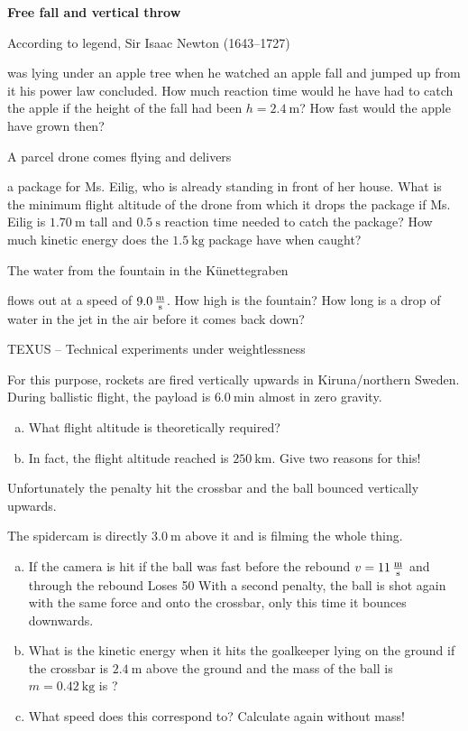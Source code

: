 \documentclass[a4paper]{article}
\begin{document}
	{\bf Free fall and vertical throw}
	
	\begin{enumerate}[1.]
		{\bf \item According to legend, Sir Isaac Newton (1643–1727) } was lying under an apple tree when he watched an apple fall and jumped up from it
		his power law concluded. How much reaction time would he have had to catch the apple if the height of the fall had been $h=\SI{2.4}{\meter}$?
		How fast would the apple have grown then?
		
		{\bf \item A parcel drone comes flying and delivers} a package for Ms. Eilig, who is already standing in front of her house. What is the minimum flight altitude of the drone from which it drops the package if Ms. Eilig is $\SI{1.70}{\meter}$ tall and $\SI{0.5}{\second}$ reaction time needed to catch the package? How much kinetic energy does the $\SI{1.5}{\kilogram}$ package have when caught?
		
		{\bf \item The water from the fountain in the Künettegraben} flows out at a speed of $\SI{9,0}{\meter\over\second}$. How high is the fountain?
		How long is a drop of water in the jet in the air before it comes back down?
		
		{\bf \item TEXUS -- Technical experiments under weightlessness} For this purpose, rockets are fired vertically upwards in Kiruna/northern Sweden. During ballistic flight, the payload is $\SI{6.0}{\minute}$ almost in zero gravity.
		\begin{enumerate}[(a)]
			\item What flight altitude is theoretically required?
			\item In fact, the flight altitude reached is $\SI{250}{\kilo\meter}$. Give two reasons for this!
		\end{enumerate}
		
		{\bf \item Unfortunately the penalty hit the crossbar and the ball bounced vertically upwards.} The spidercam is directly $\SI{3.0}{\meter}$ above it and is filming the whole thing.
		\begin{enumerate}[(a)]
			\item If the camera is hit if the ball was fast before the rebound $v=\SI{11}{\meter\over\second}$ and through the rebound
			Loses 50%
			With a second penalty, the ball is shot again with the same force and onto the crossbar, only this time it bounces downwards.
			\item What is the kinetic energy when it hits the goalkeeper lying on the ground if the crossbar is $\SI{2.4}{\meter}$ above the ground and the mass of the ball is $m=\SI{0.42 }{\kilogram}$ is ?
			\item What speed does this correspond to? Calculate again without mass!
		\end{enumerate}
		

\end{enumerate}
\end{document}
